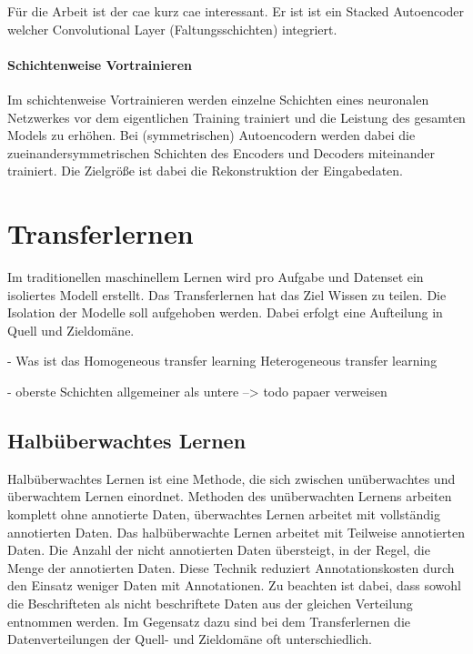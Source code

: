 	Für die Arbeit ist der \acl{cae} \cite{Masci.2011} kurz \ac{cae} interessant. Er ist ist ein Stacked Autoencoder welcher Convolutional Layer (Faltungsschichten) \cite{LeCun.1999} integriert.  

	\paragraph{Schichtenweise Vortrainieren} Im schichtenweise Vortrainieren werden einzelne Schichten eines neuronalen Netzwerkes vor dem eigentlichen Training trainiert und die Leistung des gesamten Models zu erhöhen. \cite{Bengio.2007} Bei (symmetrischen) Autoencodern werden dabei die zueinandersymmetrischen Schichten des Encoders und Decoders miteinander trainiert. Die Zielgröße ist dabei die Rekonstruktion der Eingabedaten.    

	\section{ Transferlernen}
	\label{sec:Transferlernen}
	Im traditionellen maschinellem Lernen wird pro Aufgabe und Datenset ein isoliertes Modell erstellt. Das Transferlernen hat das Ziel Wissen zu teilen. Die Isolation der Modelle soll aufgehoben werden. Dabei erfolgt eine Aufteilung in Quell und Zieldomäne.
	
		- Was ist das \cite{FuzhenZhuang.2019}
		Homogeneous transfer learning
	Heterogeneous transfer learning	
	
		-	oberste Schichten allgemeiner als untere --> todo papaer verweisen \cite{Tirumala.2018}	

		\subsection{Halbüberwachtes Lernen}
		Halbüberwachtes Lernen ist eine Methode, die sich zwischen unüberwachtes und überwachtem Lernen einordnet. Methoden des unüberwachten Lernens arbeiten komplett ohne annotierte Daten, überwachtes Lernen arbeitet mit vollständig annotierten Daten. Das halbüberwachte Lernen arbeitet mit Teilweise annotierten Daten. Die Anzahl der nicht annotierten Daten übersteigt, in der Regel, die Menge der annotierten Daten. Diese Technik reduziert Annotationskosten durch den Einsatz weniger Daten mit Annotationen. Zu beachten ist dabei, dass sowohl die Beschrifteten als nicht beschriftete Daten aus der gleichen Verteilung entnommen werden. 
		Im Gegensatz dazu sind bei dem Transferlernen die Datenverteilungen der Quell- und Zieldomäne oft unterschiedlich.
		\cite{Chapelle.2010} 
		
